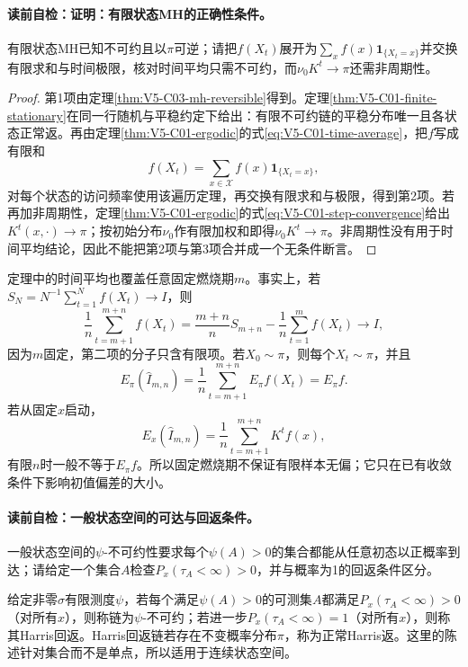 \paragraph{读前自检：证明：有限状态MH的正确性条件。}有限状态MH已知不可约且以$\pi$可逆；请把$f(X_t)$展开为$\sum_x f(x)\boldsymbol1_{\{X_t=x\}}$并交换有限求和与时间极限，核对时间平均只需不可约，而$\nu_0K^t\to\pi$还需非周期性。\par

\begin{proof}
第1项由定理\ref{thm:V5-C03-mh-reversible}得到。定理\ref{thm:V5-C01-finite-stationary}在同一行随机与平稳约定下给出：有限不可约链的平稳分布唯一且各状态正常返。再由定理\ref{thm:V5-C01-ergodic}的式\eqref{eq:V5-C01-time-average}，把$f$写成有限和
\[
f(X_t)=\sum_{x\in\mathcal X}f(x)\boldsymbol1_{\{X_t=x\}},
\]
对每个状态的访问频率使用该遍历定理，再交换有限求和与极限，得到第2项。若再加非周期性，定理\ref{thm:V5-C01-ergodic}的式\eqref{eq:V5-C01-step-convergence}给出$K^t(x,\cdot)\to\pi$；按初始分布$\nu_0$作有限加权和即得$\nu_0K^t\to\pi$。非周期性没有用于时间平均结论，因此不能把第2项与第3项合并成一个无条件断言。
\end{proof}

定理中的时间平均也覆盖任意固定燃烧期$m$。事实上，若
$S_N=N^{-1}\sum_{t=1}^Nf(X_t)\to I$，则
\[
\frac1n\sum_{t=m+1}^{m+n}f(X_t)
=\frac{m+n}{n}S_{m+n}
-\frac1n\sum_{t=1}^mf(X_t)
\longrightarrow I,
\]
因为$m$固定，第二项的分子只含有限项。若$X_0\sim\pi$，则每个$X_t\sim\pi$，并且
\[
E_\pi(\widehat I_{m,n})
=\frac1n\sum_{t=m+1}^{m+n}E_\pi f(X_t)
=E_\pi f.
\]
若从固定$x$启动，
\[
E_x(\widehat I_{m,n})
=\frac1n\sum_{t=m+1}^{m+n}K^tf(x),
\]
有限$n$时一般不等于$E_\pi f$。所以固定燃烧期不保证有限样本无偏；它只在已有收敛条件下影响初值偏差的大小。

\paragraph{读前自检：一般状态空间的可达与回返条件。}一般状态空间的$\psi$-不可约性要求每个$\psi(A)>0$的集合都能从任意初态以正概率到达；请给定一个集合$A$检查$P_x(\tau_A<\infty)>0$，并与概率为1的回返条件区分。\par

\begin{definition}[一般状态空间的可达与回返条件]\label{def:V5-C03-harris-conditions}
给定非零$\sigma$有限测度$\psi$，若每个满足$\psi(A)>0$的可测集$A$都满足$P_x(\tau_A<\infty)>0$（对所有$x$），则称链为$\psi$-不可约；若进一步$P_x(\tau_A<\infty)=1$（对所有$x$），则称其Harris回返。Harris回返链若存在不变概率分布$\pi$，称为正常Harris返。这里的陈述针对集合而不是单点，所以适用于连续状态空间。
\end{definition}

